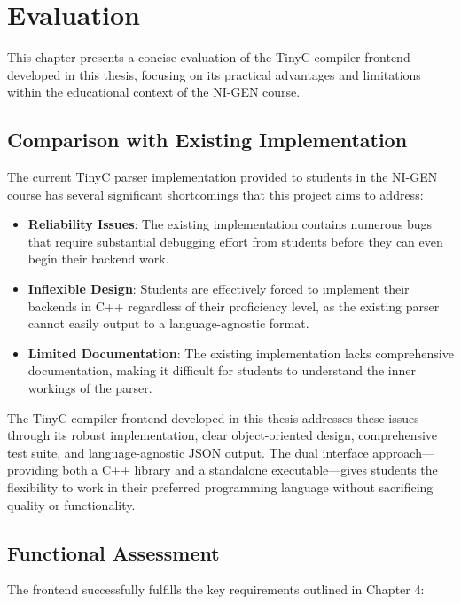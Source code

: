 \chapter{Evaluation}

This chapter presents a concise evaluation of the TinyC compiler frontend developed in this thesis, focusing on its practical advantages and limitations within the educational context of the NI-GEN course.

\section{Comparison with Existing Implementation}

The current TinyC parser implementation provided to students in the NI-GEN course has several significant shortcomings that this project aims to address:

\begin{itemize}
    \item \textbf{Reliability Issues}: The existing implementation contains numerous bugs that require substantial debugging effort from students before they can even begin their backend work.
    
    \item \textbf{Inflexible Design}: Students are effectively forced to implement their backends in C++ regardless of their proficiency level, as the existing parser cannot easily output to a language-agnostic format.
    
    \item \textbf{Limited Documentation}: The existing implementation lacks comprehensive documentation, making it difficult for students to understand the inner workings of the parser.
\end{itemize}

The TinyC compiler frontend developed in this thesis addresses these issues through its robust implementation, clear object-oriented design, comprehensive test suite, and language-agnostic JSON output. The dual interface approach—providing both a C++ library and a standalone executable—gives students the flexibility to work in their preferred programming language without sacrificing quality or functionality.

\section{Functional Assessment}

The frontend successfully fulfills the key requirements outlined in Chapter 4:

